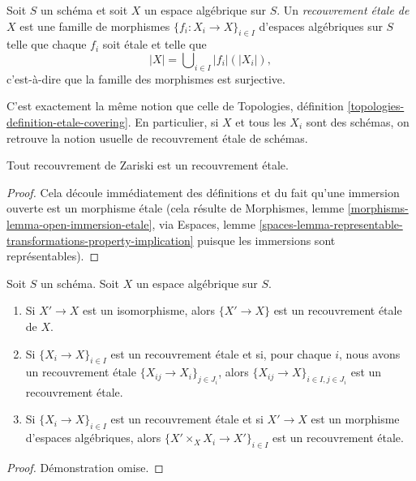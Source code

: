\begin{definition}
\label{definition-etale-covering}
Soit $S$ un schéma et soit $X$ un espace algébrique sur $S$.
Un {\it recouvrement \'etale de $X$} est une famille de morphismes
$\{f_i : X_i \to X\}_{i \in I}$ d'espaces algébriques sur $S$
telle que chaque $f_i$ soit \'etale
et telle que
$$
|X| = \bigcup\nolimits_{i \in I} |f_i|(|X_i|),
$$
c'est-à-dire que la famille des morphismes est surjective.
\end{definition}

\noindent
C'est exactement la même notion que celle de
Topologies, définition \ref{topologies-definition-etale-covering}.
En particulier, si $X$ et tous les $X_i$ sont des schémas, on retrouve la
notion usuelle de recouvrement \'etale de schémas.

\begin{lemma}
\label{lemma-zariski-etale}
Tout recouvrement de Zariski est un recouvrement \'etale.
\end{lemma}

\begin{proof}
Cela découle immédiatement des définitions et du fait qu'une immersion ouverte
est un morphisme \'etale (cela résulte de
Morphismes, lemme \ref{morphisms-lemma-open-immersion-etale}, via
Espaces, lemme
\ref{spaces-lemma-representable-transformations-property-implication}
puisque les immersions sont représentables).
\end{proof}

\begin{lemma}
\label{lemma-etale}
Soit $S$ un schéma.
Soit $X$ un espace algébrique sur $S$.
\begin{enumerate}
\item Si $X' \to X$ est un isomorphisme, alors $\{X' \to X\}$
est un recouvrement \'etale de $X$.
\item Si $\{X_i \to X\}_{i\in I}$ est un recouvrement \'etale et si, pour chaque
$i$, nous avons un recouvrement \'etale $\{X_{ij} \to X_i\}_{j\in J_i}$, alors
$\{X_{ij} \to X\}_{i \in I, j\in J_i}$ est un recouvrement \'etale.
\item Si $\{X_i \to X\}_{i\in I}$ est un recouvrement \'etale
et si $X' \to X$ est un morphisme d'espaces algébriques, alors
$\{X' \times_X X_i \to X'\}_{i\in I}$ est un recouvrement \'etale.
\end{enumerate}
\end{lemma}

\begin{proof}
Démonstration omise.
\end{proof}

